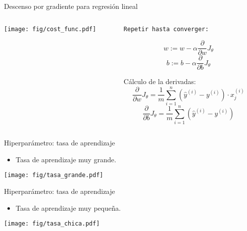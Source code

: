 \documentclass[aspectratio=169,9pt]{beamer}
\begin{document}
\begin{frame}{Descenso por gradiente para regresión lineal}
	\begin{columns}
		\begin{column}{0.55\textwidth}
			\begin{flushleft}
				\texttt{[image: fig/cost\_func.pdf]}
			\end{flushleft}
		\end{column}
		\begin{column}{0.45\textwidth}
			\texttt{Repetir hasta converger:} \vspace{-6mm}
			\begin{center}
			\begin{equation*}
				w := w  - \alpha \frac{\partial}{\partial w} J_\theta
			\end{equation*}		
			\begin{equation*}
				b := b  - \alpha \frac{\partial}{\partial b} J_\theta
			\end{equation*}
			\end{center}
			 \vspace{8mm}
			Cálculo de la derivadas:
			\begin{equation*}
			\frac{\partial}{\partial w} J_\theta  = \frac{1}{m} \sum_{i=1}^n (\hat{y}^{(i)} - y^{(i)}) \cdot x_j^{(i)}
			\end{equation*}
			\begin{equation*}
			 \frac{\partial}{\partial b} J_\theta = \frac{1}{m} \sum_{i=1}^n (\hat{y}^{(i)} - y^{(i)})
			\end{equation*}
		\end{column}
	\end{columns}
\end{frame}



\begin{frame}{Hiperparámetro: tasa de aprendizaje}
	\begin{itemize}
		\item Tasa de aprendizaje muy grande.
	\end{itemize}
	\begin{center}
		\texttt{[image: fig/tasa\_grande.pdf]}
	\end{center}
\end{frame}

\begin{frame}{Hiperparámetro: tasa de aprendizaje}
	\begin{itemize}
		\item Tasa de aprendizaje muy pequeña.
	\end{itemize}
	\begin{center}
		\texttt{[image: fig/tasa\_chica.pdf]}
	\end{center}
\end{frame}
\end{document}
